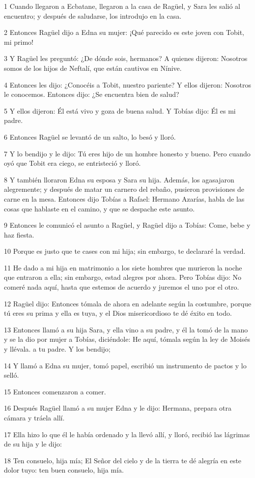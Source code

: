 \par 1 Cuando llegaron a Ecbatane, llegaron a la casa de Ragüel, y Sara les salió al encuentro; y después de saludarse, los introdujo en la casa.
\par 2 Entonces Ragüel dijo a Edna su mujer: ¡Qué parecido es este joven con Tobit, mi primo!
\par 3 Y Ragüel les preguntó: ¿De dónde sois, hermanos? A quienes dijeron: Nosotros somos de los hijos de Neftalí, que están cautivos en Nínive.
\par 4 Entonces les dijo: ¿Conocéis a Tobit, nuestro pariente? Y ellos dijeron: Nosotros le conocemos. Entonces dijo: ¿Se encuentra bien de salud?
\par 5 Y ellos dijeron: Él está vivo y goza de buena salud. Y Tobías dijo: Él es mi padre.
\par 6 Entonces Ragüel se levantó de un salto, lo besó y lloró.
\par 7 Y lo bendijo y le dijo: Tú eres hijo de un hombre honesto y bueno. Pero cuando oyó que Tobit era ciego, se entristeció y lloró.
\par 8 Y también lloraron Edna su esposa y Sara su hija. Además, los agasajaron alegremente; y después de matar un carnero del rebaño, pusieron provisiones de carne en la mesa. Entonces dijo Tobías a Rafael: Hermano Azarías, habla de las cosas que hablaste en el camino, y que se despache este asunto.
\par 9 Entonces le comunicó el asunto a Ragüel, y Ragüel dijo a Tobías: Come, bebe y haz fiesta.
\par 10 Porque es justo que te cases con mi hija; sin embargo, te declararé la verdad.
\par 11 He dado a mi hija en matrimonio a los siete hombres que murieron la noche que entraron a ella; sin embargo, estad alegres por ahora. Pero Tobías dijo: No comeré nada aquí, hasta que estemos de acuerdo y juremos el uno por el otro.
\par 12 Ragüel dijo: Entonces tómala de ahora en adelante según la costumbre, porque tú eres su prima y ella es tuya, y el Dios misericordioso te dé éxito en todo.
\par 13 Entonces llamó a su hija Sara, y ella vino a su padre, y él la tomó de la mano y se la dio por mujer a Tobías, diciéndole: He aquí, tómala según la ley de Moisés y llévala. a tu padre. Y los bendijo;
\par 14 Y llamó a Edna su mujer, tomó papel, escribió un instrumento de pactos y lo selló.
\par 15 Entonces comenzaron a comer.
\par 16 Después Ragüel llamó a su mujer Edna y le dijo: Hermana, prepara otra cámara y tráela allí.
\par 17 Ella hizo lo que él le había ordenado y la llevó allí, y lloró, recibió las lágrimas de su hija y le dijo:
\par 18 Ten consuelo, hija mía; El Señor del cielo y de la tierra te dé alegría en este dolor tuyo: ten buen consuelo, hija mía.


